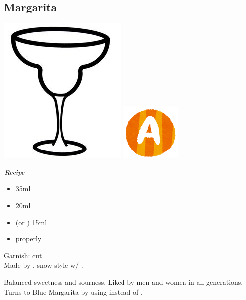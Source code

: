 \subsection{Margarita}
\vspace{-7mm}
\hspace{33mm}
\includegraphics[scale=.05]{cocktail_glass_snow.jpg}
\includegraphics[scale=.12]{capital_a.png}
\vspace{2.5mm}
\begin{itembox}[l]{\boldmath $Recipe$}
\begin{itemize}
\setlength{\parskip}{0cm}
\setlength{\itemsep}{0cm}
\item \teq 35ml
\item \wc 20ml
\item \limj (or \lj) 15ml
\item \salt properly
\end{itemize}
\vspace{-4mm}
Garnish: \lime cut\\
Made by \shake
\hspace{-1mm}, snow style w/ \salt
\hspace{-1mm}.
\end{itembox}
Balanced sweetness and sourness, Liked by men and women in all generations.
Turns to Blue Margarita by using \bc instead of \wc
\hspace{-1mm}.
